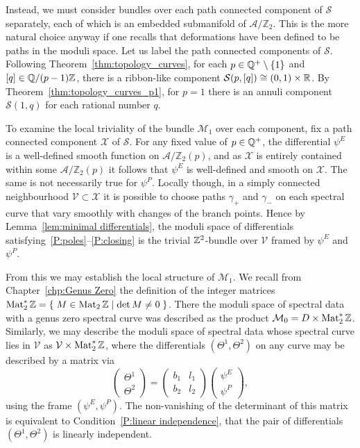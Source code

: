 \documentclass{article}
\begin{document}
Instead, we must consider bundles over each path connected component of $\mathcal{S}$ separately, each of which is an embedded submanifold of $\mathcal{A}/\mathbb{Z}_2$. This is the more natural choice anyway if one recalls that deformations have been defined to be paths in the moduli space.
Let us label the path connected components of $\mathcal{S}$. Following Theorem~\ref{thm:topology_curves}, for each $p\in \mathbb{Q}^+\setminus\{1\}$ and $[q] \in \mathbb{Q} / (p-1) \mathbb{Z}$, there is a ribbon-like component $\mathcal{S}(p,[q]) \cong (0,1)\times\mathbb{R}$. By Theorem~\ref{thm:topology_curves_p1}, for $p=1$ there is an annuli component $\mathcal{S}(1,q)$ for each rational number $q$.

To examine the local triviality of the bundle $\mathcal{M}_1$ over each component, fix a path connected component $\mathcal{X}$ of $\mathcal{S}$. For any fixed value of $p \in \mathbb{Q}^+$, the differential $\psi^E$ is a well-defined smooth function on $\mathcal{A}/\mathbb{Z}_2(p)$, and as $\mathcal{X}$ is entirely contained within some $\mathcal{A}/\mathbb{Z}_2(p)$ it follows that $\psi^E$ is well-defined and smooth on $\mathcal{X}$. The same is not necessarily true for $\psi^P$.
Locally though, in a simply connected neighbourhood $\mathcal{V} \subset \mathcal{X}$ it is possible to choose paths $\gamma_+$ and $\gamma_-$ on each spectral curve that vary smoothly with changes of the branch points. Hence by Lemma~\ref{lem:minimal differentials}, the moduli space of differentials satisfying~\ref{P:poles}--\ref{P:closing} is the trivial $\mathbb{Z}^2$-bundle over $\mathcal{V}$ framed by $\psi^E$ and $\psi^P$.

From this we may establish the local structure of $\mathcal{M}_1$.
We recall from Chapter~\ref{chp:Genus Zero} the definition of the integer matrices $\operatorname{Mat}_2^*\mathbb{Z} = \left\{\;  M \in \operatorname{Mat}_2\mathbb{Z}  \;\middle|\; \det M \neq 0 \;\right\}$. There the moduli space of spectral data with a genus zero spectral curve was described as the product $\mathcal{M}_0 = D \times \operatorname{Mat}_2^*\mathbb{Z}$. Similarly, we may describe the moduli space of spectral data whose spectral curve lies in $\mathcal{V}$ as $\mathcal{V} \times \operatorname{Mat}_2^*\mathbb{Z}$, where the differentials $(\Theta^1,\Theta^2)$ on any curve may be described by a matrix via
\[
\begin{pmatrix}
\Theta^1 \\ \Theta^2
\end{pmatrix}
=
\begin{pmatrix}
b_1 & l_1 \\
b_2 & l_2
\end{pmatrix}
\begin{pmatrix}
\psi^E \\ \psi^P
\end{pmatrix},
\]
using the frame $(\psi^E,\psi^P)$. The non-vanishing of the determinant of this matrix is equivalent to Condition~\ref{P:linear independence}, that the pair of differentials $(\Theta^1,\Theta^2)$ is linearly independent.
\end{document}
